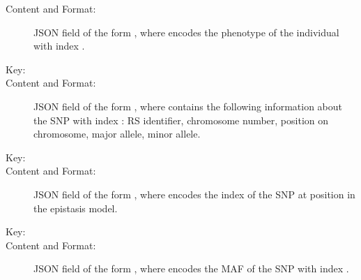 \documentclass[a4paper,10pt,english]{sphinxhowto}
\begin{document}
\begin{description}
\begin{description}
\begin{description}
\item[{Content and Format:}] \leavevmode
JSON field of the form , where  encodes the phenotype of
the individual with index .

\end{description}

\item[{\sphinxcode{\sphinxupquote{\textless{}SNP\_DATA\textgreater{}}}}] \leavevmode\begin{description}
\item[{Key:}] \leavevmode
{}

\item[{Content and Format:}] \leavevmode
JSON field of the form , where  contains the following
information about the SNP with index : RS identifier, chromosome number, position on chromosome, major allele, minor allele.

\end{description}

\item[{\sphinxcode{\sphinxupquote{\textless{}DISEASE\_SNP\_DATA\textgreater{}}}}] \leavevmode\begin{description}
\item[{Key:}] \leavevmode
{}

\item[{Content and Format:}] \leavevmode
JSON field of the form , where  encodes the index of the SNP at position 
in the epistasis model.

\end{description}

\item[{\sphinxcode{\sphinxupquote{\textless{}MAF\_DATA\textgreater{}}}}] \leavevmode\begin{description}
\item[{Key:}] \leavevmode
{}

\item[{Content and Format:}] \leavevmode
JSON field of the form , where  encodes the MAF of
the SNP with index .

\end{description}

\end{description}

\end{description}
\end{document}
